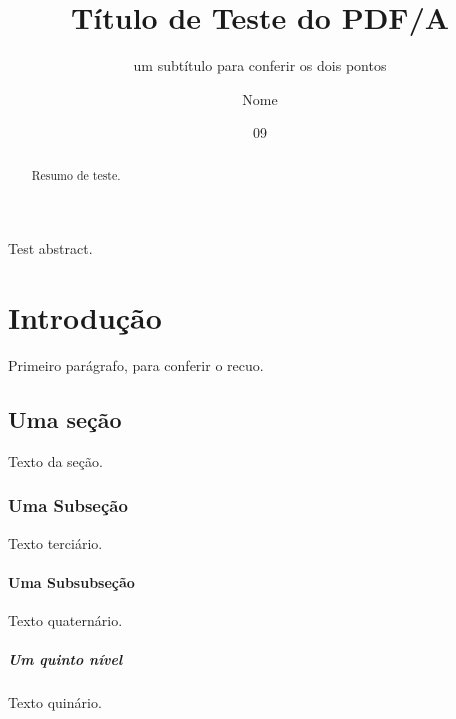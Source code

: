 \documentclass[dsc,pdfa,dadoscoleta]{ufrj}
\title{Título de Teste do PDF/A}
\subtitle{um subtítulo para conferir os dois pontos}
\author{Nome}{de Teste}
\date{09}{2026}
\begin{document}
  \maketitle
  \frontmatter
  \begin{abstract}
    Resumo de teste.
  \end{abstract}
  \begin{foreignabstract}
    Test abstract.
  \end{foreignabstract}
  \tableofcontents
  \mainmatter
  \chapter{Introdução}
    Primeiro parágrafo, para conferir o recuo.
  \section{Uma seção}
    Texto da seção.
  \subsection{Uma Subseção}
    Texto terciário.
  \subsubsection{Uma Subsubseção}
    Texto quaternário.
  \paragraph{Um quinto nível}
    Texto quinário.
\end{document}
